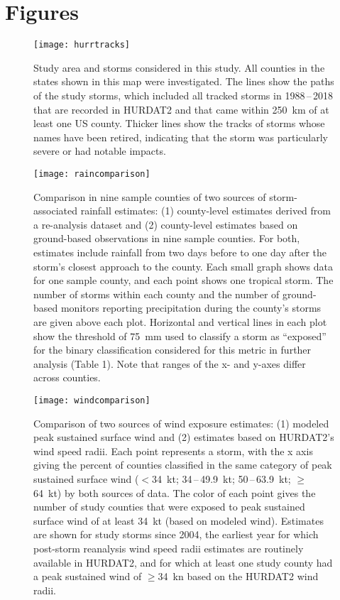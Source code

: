 \section*{Figures}

\listoffigures

\clearpage

\begin{figure}[tbhp!] \centering
\texttt{[image: hurrtracks]}
\caption{Study area and storms considered in this study. All counties in the states
	shown in this map were investigated. The lines show the paths of the
	study storms, which included all tracked storms in 1988\,--\,2018 that
	are recorded in \ac{HURDAT2} and that came
	within 250~\si{\kilo\metre} of at least one \ac{US} county. Thicker
	lines show the tracks of storms whose names have been retired,
	indicating that the storm was particularly severe or had notable
	impacts.  }
\label{fig:hurrtracks}
\end{figure}

\clearpage

\begin{figure}[tbhp!] \centering
\texttt{[image: raincomparison]} 
	\caption{Comparison in nine sample counties of two sources of storm-associated 
	rainfall estimates: (1) county-level estimates derived from 
	a re-analysis dataset and (2) county-level estimates based on ground-based
	observations in nine sample counties. For both, estimates  
	include rainfall from two days before to one day after the storm's closest
	approach to the county. Each small graph shows data for one sample county, 
	and each point shows one tropical storm. The number of storms 
	within each county and the number of ground-based monitors reporting precipitation during 
	the county's storms are given above each plot. Horizontal and vertical lines 
	in each plot show the threshold of 75~\si{\milli\metre} used to classify a storm 
	as ``exposed'' for the binary classification considered for this metric 
	in further analysis (Table 1). Note that 
	ranges of the x- and y-axes differ across counties.
	} 
\label{fig:raincomparison}
\end{figure}

\begin{figure}[tbhp!]
\centering
\texttt{[image: windcomparison]}
	\caption{Comparison of two sources of wind exposure estimates: 
	(1) modeled peak sustained surface wind 
	and (2) estimates based on \ac{HURDAT2}'s wind speed radii.
	Each point represents a storm, with the x axis giving the percent of
	counties classified in the same category of peak sustained surface
	wind ($<$34~kt; 34\,--\,49.9~kt;
	50\,--\,63.9~kt; $\ge$64~kt) by both sources of 
	data. The color of each point gives the number of study counties that were exposed to
	peak sustained surface wind of at least 34~kt (based
	on modeled wind). Estimates are shown for study storms since
	2004, the earliest year for which post-storm reanalysis wind speed
	radii estimates are routinely available in \ac{HURDAT2}, and for which at
	least one study county had a peak sustained wind of $\ge$34~\si{\knot}
	based on the \ac{HURDAT2} wind radii.
	}
\label{fig:windcomparison}
\end{figure}

